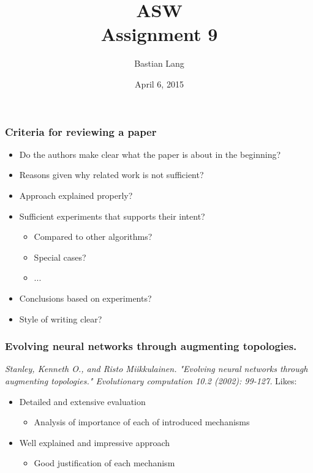\documentclass[8pt]{beamer}
\title[Assignment 9]{ASW\\Assignment 9} %
\author{Bastian Lang} %
\institute[BRSU] %
{
Master of Autonomous Systems \\ %
}
\date{April 6, 2015}
\begin{document}
\listoffigures



\begin{frame}
	\frametitle{Criteria for reviewing a paper}
	\begin{itemize}
		\item Do the authors make clear what the paper is about in the beginning?
		\item Reasons given why related work is not sufficient?
		\item Approach explained properly?
		\item Sufficient experiments that supports their intent?
		\begin{itemize}
			\item Compared to other algorithms?
			\item Special cases?
			\item ...
		\end{itemize}
		\item Conclusions based on experiments?
		\item Style of writing clear?
	\end{itemize}

\end{frame}

\begin{frame}
	\frametitle{Evolving neural networks through augmenting topologies.}
	\textit{Stanley, Kenneth O., and Risto Miikkulainen. "Evolving neural networks through augmenting topologies." Evolutionary computation 10.2 (2002): 99-127.}\vspace{5mm}
	Likes:
	\begin{itemize}
		\item Detailed and extensive evaluation
		\begin{itemize}
			\item Analysis of importance of each of introduced mechanisms
		\end{itemize}
		\item Well explained and impressive approach
		\begin{itemize}
			\item Good justification of each mechanism
		\end{itemize}
	\end{itemize}
	

\end{frame}
\end{document}
